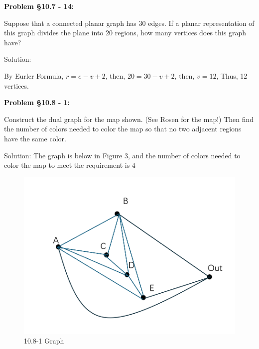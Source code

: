 \documentclass{article}
\newenvironment{problem}[1]
{\begin{mdframed}[default]
\textbf{Problem #1:}
}
{\end{mdframed}
}
\begin{document}
\begin{problem}{\S 10.7 - 14}
Suppose that a connected planar graph has $30$ edges. If a planar representation of
this graph divides the plane into $20$ regions, how many vertices does this graph
have?

Solution:

By Eurler Formula, $r=e-v+2$, then, $20=30-v+2$, then, $v=12$, Thus, 12 vertices.
\end{problem}
\begin{problem}{\S 10.8 - 1}
Construct the dual graph for the map shown. (See Rosen for the map!) Then find the
number of colors needed to color the map so that no two adjacent regions have the
same color.

Solution:
The graph is below in Figure 3, and the number of colors needed to color the map to meet the requirement is $4$
\end{problem}
\begin{figure}[h!]
    \centering
    \includegraphics[width=0.5\linewidth]{屏幕截图 2024-12-04 121927.png}
    \caption{10.8-1 Graph}
    \label{fig:enter-label}
\end{figure}
\end{document}

